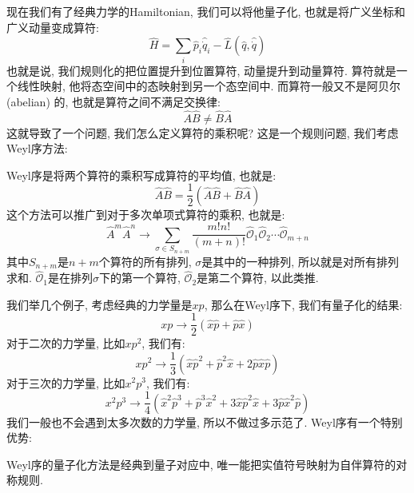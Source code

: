 现在我们有了经典力学的Hamiltonian, 我们可以将他量子化, 也就是将广义坐标和广义动量变成算符:
\begin{equation}
  \hat{H} = \sum_i \hat{p}_i \hat{\dot{q}}_i - \hat{L}(\hat{q}, \hat{\dot{q}})
\end{equation}
也就是说, 我们规则化的把位置提升到位置算符, 动量提升到动量算符.
算符就是一个线性映射, 他将态空间中的态映射到另一个态空间中.
而算符一般又不是阿贝尔 (abelian) 的, 也就是算符之间不满足交换律:
\begin{equation}
  \hat{A} \hat{B} \neq \hat{B} \hat{A}
\end{equation}
这就导致了一个问题, 我们怎么定义算符的乘积呢?
这是一个规则问题, 我们考虑Weyl序方法:
\begin{definition}[][Weyl序]
  Weyl序是将两个算符的乘积写成算符的平均值, 也就是:
  \begin{equation}
    \hat{A} \hat{B} = \frac{1}{2} (\hat{A} \hat{B} + \hat{B} \hat{A})
  \end{equation}
  这个方法可以推广到对于多次单项式算符的乘积, 也就是:
  \begin{equation}
    \hat{A}^m \hat{A}^n \to \sum_{\sigma \in S_{n+m}} \frac{m! n!}{(m+n)!} \hat{\mathcal{O}}_1 \hat{\mathcal{O}}_2 \cdots \hat{\mathcal{O}}_{m+n}
  \end{equation}
  其中$S_{n+m}$是$n+m$个算符的所有排列, $\sigma$是其中的一种排列, 所以就是对所有排列求和.
  $\hat{\mathcal{O}}_1$是在排列$\sigma$下的第一个算符, $\hat{\mathcal{O}}_2$是第二个算符, 以此类推.
\end{definition}
我们举几个例子, 考虑经典的力学量是$xp$, 那么在Weyl序下, 我们有量子化的结果:
\begin{equation}
  xp \to \frac{1}{2} (\hat{x} \hat{p} + \hat{p} \hat{x})
\end{equation}
对于二次的力学量, 比如$xp^2$, 我们有:
\begin{equation}
  xp^2 \to \frac{1}{3} (\hat{x} \hat{p}^2 + \hat{p}^2 \hat{x} + 2 \hat{p} \hat{x} \hat{p})
\end{equation}
对于三次的力学量, 比如$x^2 p^3$, 我们有:
\begin{equation}
  x^2 p^3 \to \frac{1}{4} (\hat{x}^2 \hat{p}^3 + \hat{p}^3 \hat{x}^2 + 3 \hat{x} \hat{p}^2 \hat{x} + 3 \hat{p} \hat{x}^2 \hat{p})
\end{equation}
我们一般也不会遇到太多次数的力学量, 所以不做过多示范了.
Weyl序有一个特别优势:
\begin{theorem}[][Weyl序的优势]
  Weyl序的量子化方法是经典到量子对应中, 唯一能把实值符号映射为自伴算符的对称规则.
\end{theorem}

